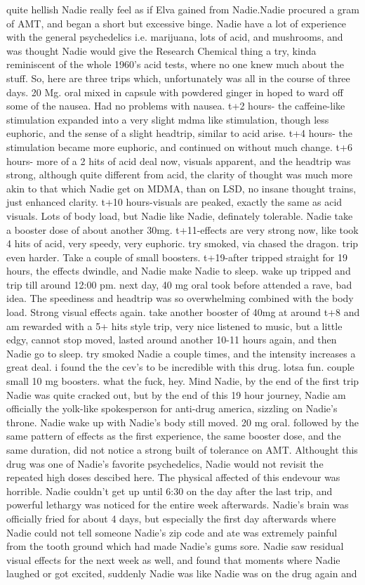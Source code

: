 \documentclass[12pt]{book}
\begin{document}
quite hellish Nadie really feel as if Elva gained from Nadie.Nadie procured a gram of AMT, and began a short but excessive binge. Nadie have a lot of experience with the general psychedelics i.e. marijuana, lots of acid, and mushrooms, and was thought Nadie would give the Research Chemical thing a try, kinda reminiscent of the whole 1960's acid tests, where no one knew much about the stuff. So, here are three trips which, unfortunately was all in the course of three days. 20 Mg. oral mixed in capsule with powdered ginger in hoped to ward off some of the nausea. Had no problems with nausea. t+2 hours- the caffeine-like stimulation expanded into a very slight mdma like stimulation, though less euphoric, and the sense of a slight headtrip, similar to acid arise. t+4 hours- the stimulation became more euphoric, and continued on without much change. t+6 hours- more of a 2 hits of acid deal now, visuals apparent, and the headtrip was strong, although quite different from acid, the clarity of thought was much more akin to that which Nadie get on MDMA, than on LSD, no insane thought trains, just enhanced clarity. t+10 hours-visuals are peaked, exactly the same as acid visuals. Lots of body load, but Nadie like Nadie, definately tolerable. Nadie take a booster dose of about another 30mg. t+11-effects are very strong now, like took 4 hits of acid, very speedy, very euphoric. try smoked, via chased the dragon. trip even harder. Take a couple of small boosters. t+19-after tripped straight for 19 hours, the effects dwindle, and Nadie make Nadie to sleep. wake up tripped and trip till around 12:00 pm. next day, 40 mg oral took before attended a rave, bad idea. The speediness and headtrip was so overwhelming combined with the body load. Strong visual effects again. take another booster of 40mg at around t+8 and am rewarded with a 5+ hits style trip, very nice listened to music, but a little edgy, cannot stop moved, lasted around another 10-11 hours again, and then Nadie go to sleep. try smoked Nadie a couple times, and the intensity increases a great deal. i found the the cev's to be incredible with this drug. lotsa fun. couple small 10 mg boosters. what the fuck, hey. Mind Nadie, by the end of the first trip Nadie was quite cracked out, but by the end of this 19 hour journey, Nadie am officially the yolk-like spokesperson for anti-drug america, sizzling on Nadie's throne. Nadie wake up with Nadie's body still moved. 20 mg oral. followed by the same pattern of effects as the first experience, the same booster dose, and the same duration, did not notice a strong built of tolerance on AMT. Althought this drug was one of Nadie's favorite psychedelics, Nadie would not revisit the repeated high doses descibed here. The physical affected of this endevour was horrible. Nadie couldn't get up until 6:30 on the day after the last trip, and powerful lethargy was noticed for the entire week afterwards. Nadie's brain was officially fried for about 4 days, but especially the first day afterwards where Nadie could not tell someone Nadie's zip code and ate was extremely painful from the tooth ground which had made Nadie's gums sore. Nadie saw residual visual effects for the next week as well, and found that moments where Nadie laughed or got excited, suddenly Nadie was like Nadie was on the drug again and 
\end{document}
